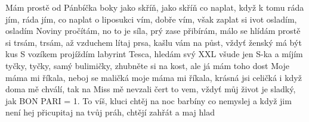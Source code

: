 \ve{}
Mám prostě od Pánbíčka
boky jako skříň, jako skříň
co naplat, když k tomu ráda jím, ráda jím, co naplat
o liposukci vím, dobře vím,
však zaplat si ivot osladím, osladím
\ve{}
Noviny pročítám, no to je síla,
prý zase přibírám, málo se hlídám
prostě si trsám, trsám,
až vzduchem lítaj prsa,
kašlu vám na půst,
vždyť ženský má být kus
\ve{}
S vozíkem projíždím labyrint Tesca,
hledám svý XXL
všude jen S-ka
a míjím tyčky, tyčky, samý bulimičky,
zhubněte si na kost,
ale já mám toho dost
\cho{}
Moje máma mi říkala,
neboj se maličká
moje máma mi říkala,
krásná jsi celičká
i když doma mě chválí,
tak na Miss mě nevzali
čert to vem,
vždyť můj život je sladký, jak BON PARI
\ve{}
= 1.
\ve{}
To víš, kluci chtěj
na noc barbíny co nemyslej
a když jim není hej
přicupitaj na tvůj práh,
chtějí zahřát a maj hlad
\cho{}
\esong{}